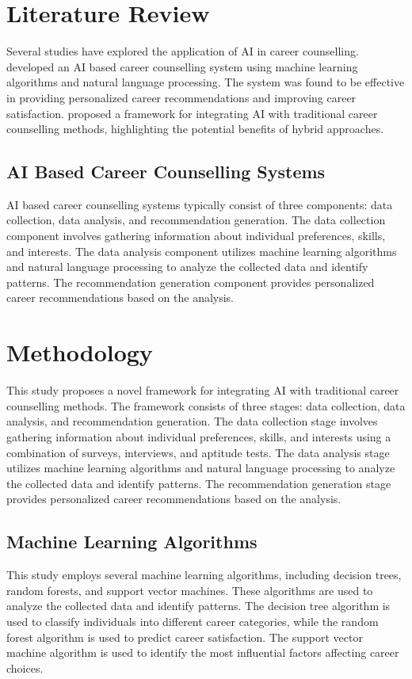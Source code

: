 \documentclass[12pt,a4paper,twocolumn]{article}
\begin{document}
\section{Literature Review}
Several studies have explored the application of AI in career counselling. \citet{patel2019} developed an AI based career counselling system using machine learning algorithms and natural language processing. The system was found to be effective in providing personalized career recommendations and improving career satisfaction. \citet{kim2020} proposed a framework for integrating AI with traditional career counselling methods, highlighting the potential benefits of hybrid approaches.

\subsection{AI Based Career Counselling Systems}
AI based career counselling systems typically consist of three components: data collection, data analysis, and recommendation generation. The data collection component involves gathering information about individual preferences, skills, and interests. The data analysis component utilizes machine learning algorithms and natural language processing to analyze the collected data and identify patterns. The recommendation generation component provides personalized career recommendations based on the analysis.

\section{Methodology}
This study proposes a novel framework for integrating AI with traditional career counselling methods. The framework consists of three stages: data collection, data analysis, and recommendation generation. The data collection stage involves gathering information about individual preferences, skills, and interests using a combination of surveys, interviews, and aptitude tests. The data analysis stage utilizes machine learning algorithms and natural language processing to analyze the collected data and identify patterns. The recommendation generation stage provides personalized career recommendations based on the analysis.

\subsection{Machine Learning Algorithms}
This study employs several machine learning algorithms, including decision trees, random forests, and support vector machines. These algorithms are used to analyze the collected data and identify patterns. The decision tree algorithm is used to classify individuals into different career categories, while the random forest algorithm is used to predict career satisfaction. The support vector machine algorithm is used to identify the most influential factors affecting career choices.
\end{document}
